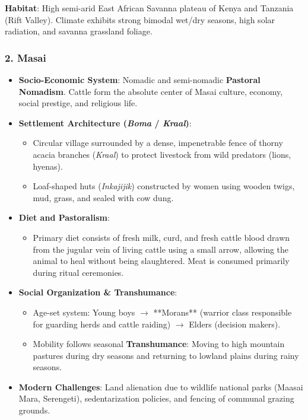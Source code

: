 \documentclass[11pt,a4paper]{article}
\begin{document}
\begin{casebox}
\textbf{Habitat}: High semi-arid East African Savanna plateau of Kenya and Tanzania (Rift Valley). Climate exhibits strong bimodal wet/dry seasons, high solar radiation, and savanna grassland foliage.
\end{casebox}

\subsubsection{2. Masai}
\begin{itemize}[leftmargin=*]
  \item \textbf{Socio-Economic System}: Nomadic and semi-nomadic \textbf{Pastoral Nomadism}. Cattle form the absolute center of Masai culture, economy, social prestige, and religious life.
  \item \textbf{Settlement Architecture (\textit{Boma} / \textit{Kraal})}:
  \begin{itemize}
    \item Circular village surrounded by a dense, impenetrable fence of thorny acacia branches (\textit{Kraal}) to protect livestock from wild predators (lions, hyenas).
    \item Loaf-shaped huts (\textit{Inkajijik}) constructed by women using wooden twigs, mud, grass, and sealed with cow dung.
  \end{itemize}
  \item \textbf{Diet and Pastoralism}:
  \begin{itemize}
    \item Primary diet consists of fresh milk, curd, and fresh cattle blood drawn from the jugular vein of living cattle using a small arrow, allowing the animal to heal without being slaughtered. Meat is consumed primarily during ritual ceremonies.
  \end{itemize}
  \item \textbf{Social Organization \& Transhumance}:
  \begin{itemize}
    \item Age-set system: Young boys $\rightarrow$ **Morans** (warrior class responsible for guarding herds and cattle raiding) $\rightarrow$ Elders (decision makers).
    \item Mobility follows seasonal \textbf{Transhumance}: Moving to high mountain pastures during dry seasons and returning to lowland plains during rainy seasons.
  \end{itemize}
  \item \textbf{Modern Challenges}: Land alienation due to wildlife national parks (Maasai Mara, Serengeti), sedentarization policies, and fencing of communal grazing grounds.
\end{itemize}
\end{document}
